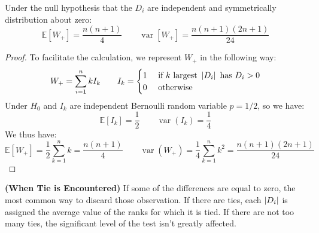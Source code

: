 \begin{proposition}
    Under the null hypothesis that the $D_i$ are independent and symmetrically distribution about zero:
    \begin{equation*}
        \mathbb{E}[W_+] = \frac{n(n+1)}{4} \qquad \operatorname{var}[W_+] = \frac{n(n+1)(2n+1)}{24}
    \end{equation*}
\end{proposition}
\begin{proof}
    To facilitate the calculation, we represent $W_+$ in the following way:
    \begin{equation*}
        W_+ = \sum^n_{i=1}kI_k \qquad I_k = \begin{cases}
            1 & \text{ if } k \text{ largest } \left| D_i \right| \text{ has } D_i > 0 \\
            0 & \text{ otherwise } 
        \end{cases}
    \end{equation*}
    Under $H_0$ and $I_k$ are independent Bernoulli random variable $p=1/2$, so we have:
    \begin{equation*}
        \mathbb{E}[I_k] = \frac{1}{2} \qquad \operatorname{var}(I_k) = \frac{1}{4}
    \end{equation*}
    We thus have:
    \begin{equation*}
        \mathbb{E}[W_+] = \frac{1}{2}\sum^n_{k=1}k = \frac{n(n+1)}{4} \qquad \operatorname{var}(W_+) = \frac{1}{4}\sum^n_{k=1} k^2 = \frac{n(n+1)(2n+1)}{24}
    \end{equation*}
\end{proof}

\begin{remark}{\textbf{(When Tie is Encountered)}}
    If some of the differences are equal to zero, the most common way to discard those observation. If there are ties, each $\left| D_i \right|$ is assigned the average value of the ranks for which it is tied. If there are not too many ties, the significant level of the test isn't greatly affected. 
\end{remark}


